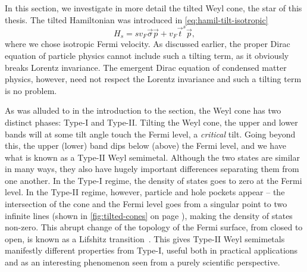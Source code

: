 In this section, we investigate in more detail the tilted Weyl cone, the star of this thesis.
The tilted Hamiltonian was introduced in \cref{eq:hamil-tilt-isotropic}
\[
H_s = s v_F \vec{\sigma} \vec{p} + v_F \vec{t}^{s} \vec{p},
\]
where we chose isotropic Fermi velocity.
As discussed earlier, the proper Dirac equation of particle physics cannot include such a tilting term, as it obviously breaks Lorentz invariance.
The emergent Dirac equation of condensed matter physics, however, need not respect the Lorentz invariance and such a tilting term is no problem.

As was alluded to in the introduction to the section, the Weyl cone has two distinct phases: Type-I and
Type-II.
Tilting the Weyl cone, the upper and lower bands will at some tilt angle touch the Fermi level, a \emph{critical} tilt.
Going beyond this, the upper (lower) band dips below (above) the Fermi level, and we have what is known as a Type-II Weyl semimetal.
Although the two states are similar in many ways, they also have hugely important differences separating them from one another.
In the Type-I regime, the density of states goes to zero at the Fermi level.
In the Type-II regime, however, particle and hole pockets appear -- the intersection of the cone and the Fermi level goes from a singular point to two infinite lines (shown in \cref{fig:tilted-cones} on page \pageref{fig:tilted-cones}), making the density of states non-zero.
This abrupt change of the topology of the Fermi surface, from closed to open, is known as a Lifshitz transition~\cite{volovikTopologicalLifshitzTransitions2017}.
This gives Type-II Weyl semimetals manifestly different properties from Type-I, useful both in practical applications and as an interesting phenomenon seen from a purely scientific perspective.


